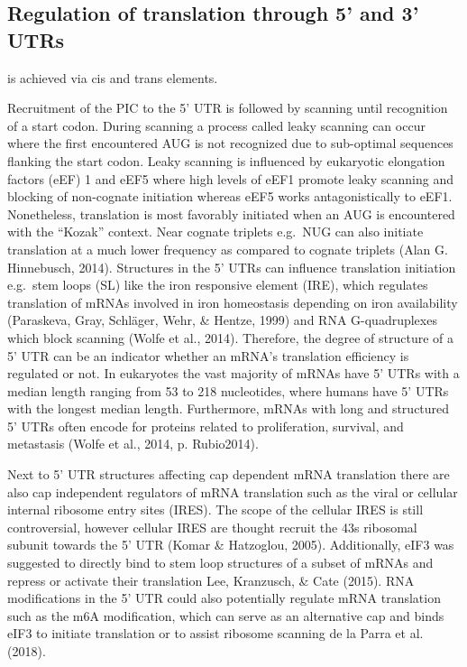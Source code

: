 \documentclass[
  12pt,
  openany]{book}
\begin{document}
\subsection{Regulation of translation through 5’ and 3’ UTRs}

is achieved via cis and trans elements.

Recruitment of the PIC to the 5' UTR is followed by scanning until recognition of a start codon. During scanning a process called leaky scanning can occur where the first encountered AUG is not recognized due to sub-optimal sequences flanking the start codon. Leaky scanning is influenced by eukaryotic elongation factors (eEF) 1 and eEF5 where high levels of eEF1 promote leaky scanning and blocking of non-cognate initiation whereas eEF5 works antagonistically to eEF1. Nonetheless, translation is most favorably initiated when an AUG is encountered with the ``Kozak'' context. Near cognate triplets e.g.~NUG can also initiate translation at a much lower frequency as compared to cognate triplets (Alan G. Hinnebusch, 2014). Structures in the 5' UTRs can influence translation initiation e.g.~stem loops (SL) like the iron responsive element (IRE), which regulates translation of mRNAs involved in iron homeostasis depending on iron availability (Paraskeva, Gray, Schläger, Wehr, \& Hentze, 1999) and RNA G-quadruplexes which block scanning (Wolfe et al., 2014). Therefore, the degree of structure of a 5' UTR can be an indicator whether an mRNA's translation efficiency is regulated or not. In eukaryotes the vast majority of mRNAs have 5' UTRs with a median length ranging from 53 to 218 nucleotides, where humans have 5' UTRs with the longest median length. Furthermore, mRNAs with long and structured 5' UTRs often encode for proteins related to proliferation, survival, and metastasis (Wolfe et al., 2014, p. Rubio2014).

Next to 5' UTR structures affecting cap dependent mRNA translation there are also cap independent regulators of mRNA translation such as the viral or cellular internal ribosome entry sites (IRES). The scope of the cellular IRES is still controversial, however cellular IRES are thought recruit the 43s ribosomal subunit towards the 5' UTR (Komar \& Hatzoglou, 2005). Additionally, eIF3 was suggested to directly bind to stem loop structures of a subset of mRNAs and repress or activate their translation Lee, Kranzusch, \& Cate (2015). RNA modifications in the 5' UTR could also potentially regulate mRNA translation such as the m6A modification, which can serve as an alternative cap and binds eIF3 to initiate translation or to assist ribosome scanning de la Parra et al. (2018).
\end{document}
